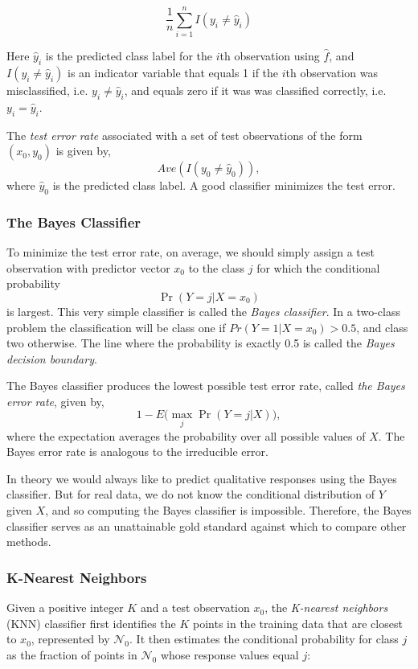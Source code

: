 \documentclass{article}
\numberwithin{equation}{section}
\begin{document}
\begin{equation}
    \frac{1}{n} \sum_{i=1}^n I(y_i  \neq \hat y_i)
\end{equation}

Here $\hat y_i$ is the predicted class label for the $i$th observation using $\hat f$, and $I(y_i \neq \hat y_i)$ is an indicator variable that equals 1 if the $i$th observation was misclassified, i.e. $y_i \neq \hat y_i$, and equals zero if it was was classified correctly, i.e. $y_i = \hat y_i$.


The \textit{test error rate} associated with a set of test observations of the form $(x_0, y_0)$ is given by,
\begin{equation}
    Ave(I(y_0 \neq \hat y_0)),
\end{equation}
where $\hat y_0$ is the predicted class label. A good classifier minimizes the test error.

\subsubsection{The Bayes Classifier}
To minimize the test error rate, on average, we should simply assign a test observation with predictor vector $x_0$ to the class $j$ for which the conditional probability
\begin{equation}
    \Pr(Y = j|X = x_0)
\end{equation}
is largest. This very simple classifier is called the \textit{Bayes classifier}. In a two-class problem the classification will be class one if $Pr(Y = 1|X = x_0) > 0.5$, and class two otherwise. The line where the probability is exactly 0.5 is called the \textit{Bayes decision boundary}.

The Bayes classifier produces the lowest possible test error rate, called \textit{the Bayes error rate}, given by,
\begin{equation}
1 - E \Bigg( \max_j \Pr(Y = j|X) \Bigg ),
\end{equation}
where the expectation averages the probability over all possible values of $X$. The Bayes error rate is analogous to the irreducible error.

In theory we would always like to predict qualitative responses using the Bayes classifier. But for real data, we do not know the conditional distribution of $Y$ given $X$, and so computing the Bayes classifier is impossible. Therefore, the Bayes classifier serves as an unattainable gold standard against which to compare other methods.

\subsubsection{K-Nearest Neighbors}
Given a positive integer $K$ and a test observation $x_0$, the \textit{K-nearest neighbors} (KNN) classifier first identifies the $K$ points in the training data that are closest to $x_0$, represented by $\mathcal N_0$. It then estimates the conditional probability for class $j$ as the fraction of points in $\mathcal N_0$ whose response values equal $j$:
\end{document}
